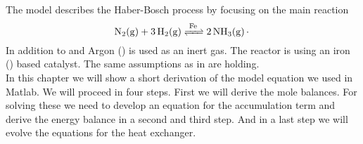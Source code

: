 \documentclass[paper=letter, fontsize=12pt]{article}
\newcommand\reaction[1]{\begin{equation}\ce{#1}\end{equation}}
\begin{document}
The model describes the Haber-Bosch process by focusing on the main reaction
\reaction{N2(g) + 3H2(g) <=>[Fe] 2NH3(g).} \label{f:reaction}
In addition to  and  Argon () is used as an inert gas. The reactor is using an iron () based catalyst. The same assumptions as in \cite{Jinasena2016} are holding.\\
In this chapter we will show a short derivation of the model equation we used in Matlab. We will proceed in four steps. First we will derive the mole balances. For solving these we need to develop an equation for the accumulation term and derive the energy balance in a second and third step. And in a last step we will evolve the equations for the heat exchanger.

\begin{figure}
\begin{centering}
\end{centering}
\end{figure}
\end{document}
